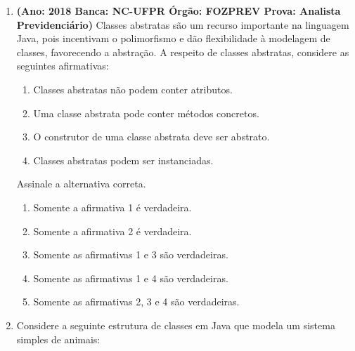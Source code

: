 \documentclass[12pt,a4paper]{article}
\begin{document}
\begin{enumerate}
    \item \textbf{(Ano: 2018 Banca: NC-UFPR Órgão: FOZPREV Prova: Analista Previdenciário)} Classes abstratas são um recurso importante na linguagem Java, pois incentivam o polimorfismo e dão flexibilidade à modelagem de classes, favorecendo a abstração. A respeito de classes abstratas, considere as seguintes afirmativas:
    
    \begin{enumerate}[label=\arabic*.]
        \item Classes abstratas não podem conter atributos.
        \item Uma classe abstrata pode conter métodos concretos.
        \item O construtor de uma classe abstrata deve ser abstrato.
        \item Classes abstratas podem ser instanciadas.
    \end{enumerate}
    
    Assinale a alternativa correta.
    
    \begin{enumerate}[label=\Alph*)]
        \item Somente a afirmativa 1 é verdadeira.
        \item Somente a afirmativa 2 é verdadeira.
        \item Somente as afirmativas 1 e 3 são verdadeiras.
        \item Somente as afirmativas 1 e 4 são verdadeiras.
        \item Somente as afirmativas 2, 3 e 4 são verdadeiras.
    \end{enumerate}

    \item Considere a seguinte estrutura de classes em Java que modela um sistema simples de animais:


    \begin{center}
\end{center}
\end{enumerate}
\end{document}
